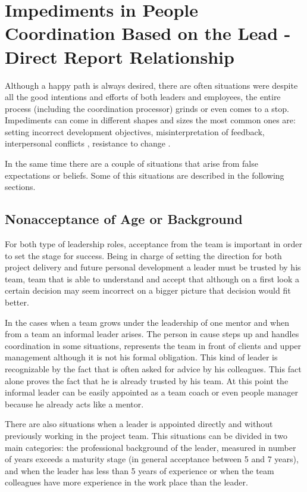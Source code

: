 \chapter{Impediments in People Coordination Based on the Lead - Direct Report Relationship}
\label{chapter:impediments}

Although a happy path is always desired, there are often situations were despite all the good intentions and efforts of both leaders and employees, the entire process (including the coordination processor) grinds or even comes to a stop. Impediments can come in different shapes and sizes the most common ones are: setting incorrect development objectives, misinterpretation of feedback, interpersonal conflicts \cite{abur-pm}, resistance to change \cite{abur-tl}. 

In the same time there are a couple of situations that arise from false expectations or beliefs. Some of this situations are described in the following sections.

\section{Nonacceptance of Age or Background}
\label{sec:unnaceptance}
For both type of leadership roles, acceptance from the team is important in order to set the stage for success. Being in charge of setting the direction for both project delivery and future personal development a leader must be trusted by his team, team that is able to understand and accept that although on a first look a certain decision may seem incorrect on a bigger picture that decision would fit better. 

In the cases when a team grows under the leadership of one mentor and when from a team an informal leader arises. The person in cause steps up and handles coordination in some situations, represents the team in front of clients and upper management although it is not his formal obligation. This kind of leader is recognizable by the fact that is often asked for advice by his colleagues. This fact alone proves the fact that he is already trusted by his team. At this point the informal leader can be easily appointed as a team coach or even people manager because he already acts like a mentor.

There are also situations when a leader is appointed directly and without previously working in the project team. This situations can be divided in two main categories: the professional background of the leader, measured in number of years exceeds a maturity stage (in general acceptance between 5 and 7 years), and when the leader has less than 5 years of experience or when the team colleagues have more experience in the work place than the leader.

